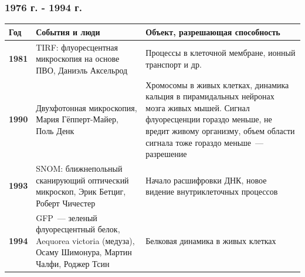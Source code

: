 \documentclass[9pt, compress, xcolor=table]{beamer}
\begin{document}
\begin{frame}[fragile]
  \frametitle{1976 г. - 1994 г.}
  
\begin{table}[htbp]
\begin{center}
\small
\arrayrulewidth=1pt
\begin{tabular}{|l|p{}|p{}|}
\hline
\cellcolor{gray!25}\textbf{Год} & 
\cellcolor{gray!25}\textbf{События и люди} & 
\cellcolor{gray!25}\textbf{Объект, разрешающая способность} \\ \hline
\textbf{1981} & 
TIRF: флуоресцентная микроскопия на основе ПВО, Даниэль Аксельрод & 
Процессы в клеточной мембране, ионный транспорт и др. \\ \hline
\textbf{1990} & 
Двухфотонная микроскопия, Мария Гёпперт-Майер, Поль Денк & 
Хромосомы в живых клетках, динамика кальция в пирамидальных нейронах мозга живых мышей. Сигнал флуоресценции гораздо меньше, не вредит живому организму, объем области сигнала тоже гораздо меньше~--- разрешение \\ \hline
\textbf{1993} & 
SNOM: ближнепольный сканирующий оптический микроскоп, Эрик Бетциг, Роберт Чичестер& 
Начало расшифровки ДНК, новое видение внутриклеточных процессов \\ \hline
\textbf{1994} & 
GFP~--- зеленый флуоресцентный белок, Aequorea victoria (медуза), Осаму Шимонура, Мартин Чалфи, Роджер Тсин& Белковая динамика в живых клетках  \\ \hline
\end{tabular}\label{tab3}
\end{center}
\end{table}

\end{frame}
\end{document}
